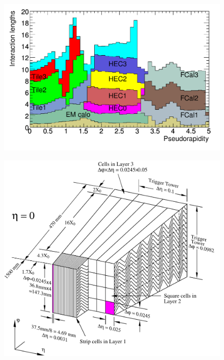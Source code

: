 \begin{figure}[hbtp]
\includegraphics[width=\fullfig]{figures/calo_interactionlengths.pdf}
\caption{}
\label{fig:calo_interactionlengths}
\end{figure}

\begin{figure}[hbtp]
\includegraphics[width=\fullfig]{figures/calo_barrel_schematic.pdf}
\caption{}
\label{fig:calo_barrel_schematic}
\end{figure}

